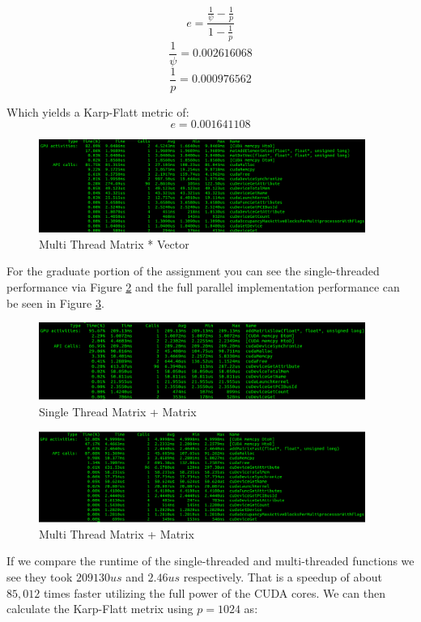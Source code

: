 \documentclass{article}
\begin{document}
$$e = \frac{\frac{1}{\psi} - \frac{1}{p}}{1 - \frac{1}{p}}$$
$$\frac{1}{\psi} = 0.002616068$$
$$\frac{1}{p} = 0.000976562$$

Which yields a Karp-Flatt metric of:
$$e = 0.001641108$$

\begin{figure}[h]
    \centering
    \includegraphics[width=0.95\textwidth]{fast}
    \caption{Multi Thread Matrix * Vector}
    \label{fig:fast}
\end{figure}

For the graduate portion of the assignment you can see the single-threaded 
performance via Figure \ref{fig:slowGrad} and the full parallel implementation 
performance can be seen in Figure \ref{fig:fastGrad}.

\begin{figure}[h]
    \centering
    \includegraphics[width=0.95\textwidth]{slowGrad}
    \caption{Single Thread Matrix + Matrix}
    \label{fig:slowGrad}
\end{figure}



\begin{figure}[h]
    \centering
    \includegraphics[width=0.95\textwidth]{fastGrad}
    \caption{Multi Thread Matrix + Matrix}
    \label{fig:fastGrad}
\end{figure}

If we compare the runtime of the single-threaded and multi-threaded functions we 
see they took $209130us$ and $2.46us$ respectively. That is a speedup of about 
$85,012$ times faster utilizing the full power of the CUDA cores. We can then 
calculate the Karp-Flatt metrix using $p=1024$ as:
\end{document}
